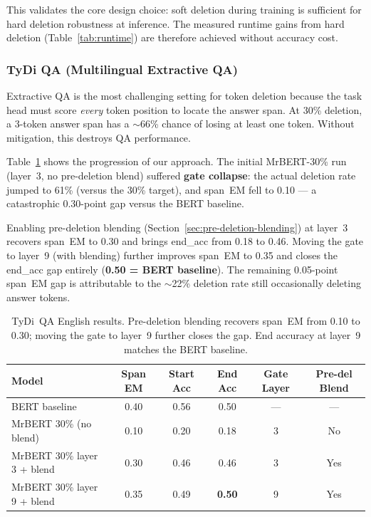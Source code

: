 This validates the core design choice: soft deletion during training is sufficient for hard deletion robustness at inference. The measured runtime gains from hard deletion (Table~\ref{tab:runtime}) are therefore achieved without accuracy cost.


\subsubsection{TyDi QA (Multilingual Extractive QA)}

Extractive QA is the most challenging setting for token deletion because the task head must score \emph{every} token position to locate the answer span.
At 30\% deletion, a 3-token answer span has a $\sim$66\% chance of losing at least one token.
Without mitigation, this destroys QA performance.

Table~\ref{tab:tydiqa-results} shows the progression of our approach.
The initial MrBERT-30\% run (layer~3, no pre-deletion blend) suffered \textbf{gate collapse}: the actual deletion rate jumped to 61\% (versus the 30\% target), and span~EM fell to 0.10 --- a catastrophic 0.30-point gap versus the BERT baseline.

Enabling pre-deletion blending (Section~\ref{sec:pre-deletion-blending}) at layer~3 recovers span~EM to 0.30 and brings end\_acc from 0.18 to 0.46.
Moving the gate to layer~9 (with blending) further improves span~EM to 0.35 and closes the end\_acc gap entirely (\textbf{0.50 = BERT baseline}).
The remaining 0.05-point span~EM gap is attributable to the $\sim$22\% deletion rate still occasionally deleting answer tokens.

\begin{table}[h]
\centering
\begin{tabular}{@{}lccccc@{}}
\toprule
\textbf{Model} & \textbf{Span EM} & \textbf{Start Acc} & \textbf{End Acc} & \textbf{Gate Layer} & \textbf{Pre-del Blend} \\
\midrule
BERT baseline                        & 0.40 & 0.56 & 0.50 & --- & --- \\
MrBERT 30\% (no blend)              & 0.10 & 0.20 & 0.18 & 3   & No  \\
MrBERT 30\% layer 3 + blend         & 0.30 & 0.46 & 0.46 & 3   & Yes \\
MrBERT 30\% layer 9 + blend         & 0.35 & 0.49 & \textbf{0.50} & 9   & Yes \\
\bottomrule
\end{tabular}
\caption{TyDi~QA English results. Pre-deletion blending recovers span~EM from 0.10 to 0.30; moving the gate to layer~9 further closes the gap. End accuracy at layer~9 matches the BERT baseline.}
\label{tab:tydiqa-results}
\end{table}


